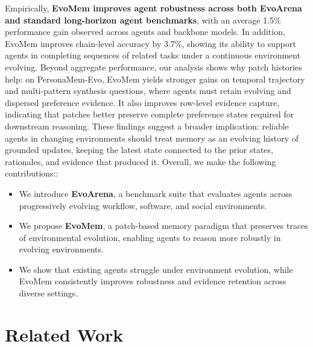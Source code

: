 \documentclass{llmxive}
\begin{document}
Empirically, \textbf{EvoMem improves agent robustness across both EvoArena and standard long-horizon agent benchmarks}, with an average 1.5\% performance gain observed across agents and backbone models. 
In addition, EvoMem improves chain-level accuracy by 3.7\%, showing its ability to support agents in completing sequences of related tasks under a continuous environment evolving.
Beyond aggregate performance, our analysis shows why patch histories help: on PersonaMem-Evo, EvoMem yields stronger gains on temporal trajectory and multi-pattern synthesis questions, where agents must retain evolving and dispersed preference evidence. It also improves row-level evidence capture, indicating that patches better preserve complete preference states required for downstream reasoning. These findings suggest a broader implication: reliable agents in changing environments should treat memory as an evolving history of grounded updates, keeping the latest state connected to the prior states, rationales, and evidence that produced it. Overall, we make the following contributions::
\begin{itemize}
    \item We introduce \textbf{EvoArena}, a benchmark suite that evaluates agents across progressively evolving workflow, software, and social environments.
    \item We propose \textbf{EvoMem}, a patch-based memory paradigm that preserves traces of environmental evolution, enabling agents to reason more robustly in evolving environments.
    \item We show that existing agents struggle under environment evolution, while EvoMem consistently improves robustness and evidence retention across diverse settings.
\end{itemize}

\vspace{-3mm}




\section{Related Work}
\vspace{-1mm}
\end{document}
